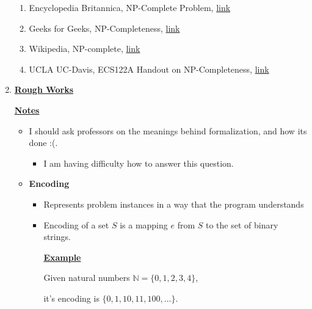 \documentclass[12pt]{article}
\begin{document}
\begin{enumerate}[1.]
    \begin{enumerate}[1)]
        \item Encyclopedia Britannica, NP-Complete Problem, \href{https://www.britannica.com/science/NP-complete-problem}{link}
        \item Geeks for Geeks, NP-Completeness, \href{https://www.geeksforgeeks.org/np-completeness-set-1/}{link}
        \item Wikipedia, NP-complete, \href{https://simple.wikipedia.org/wiki/NP-complete}{link}
        \item UCLA UC-Davis, ECS122A Handout on NP-Completeness, \href{https://web.cs.ucdavis.edu/~bai/ECS122A/npcnotes.pdf}{link}
    \end{enumerate}

    \item

    \bigskip

    \underline{\textbf{Rough Works}}

    \bigskip

    \underline{\textbf{Notes}}

    \bigskip

    \begin{itemize}
        \item I should ask professors on the meanings behind formalization, and how
        its done :(.

        \begin{itemize}
            \item I am having difficulty how to answer this question.
        \end{itemize}
        \item \textbf{Encoding}

        \begin{itemize}
            \item Represents problem instances in a way that the program understands
            \item Encoding of a set $S$ is a mapping $e$ from $S$ to the set of binary strings.

            \bigskip

            \underline{\textbf{Example}}

            \bigskip

            Given natural numbers $\mathbb{N} = \{0,1,2,3,4\}$,

            \bigskip

            it's encoding is $\{0,1,10,11,100, ...\}$.


\end{itemize}
\end{itemize}
\end{enumerate}
\end{document}
